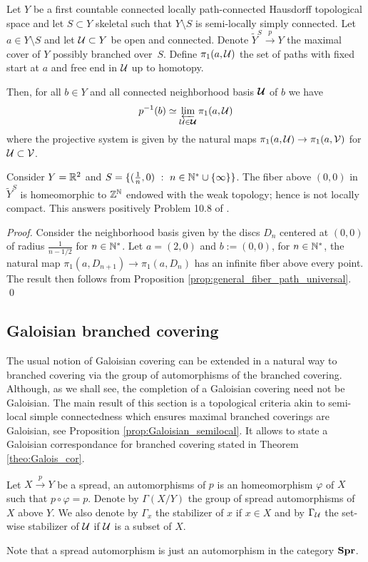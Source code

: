 \begin{prop} \label{prop:general_fiber_path_universal}
 Let $Y$ be a first countable connected locally path-connected Hausdorff topological space and let $S\subset Y$ skeletal such  that $Y\setminus S$ is semi-locally simply connected. Let $a\in Y\setminus S$ and let $\mathcal{U}\subset Y$ be open and connected.   Denote $\widetilde Y^S\xrightarrow{p} Y$ the maximal cover of $Y$ possibly branched over~$S$. Define
$\pi_1(a,\mathcal{U})$ the set of paths with fixed start at $a$ and free end in $\mathcal{U}$ up to homotopy.

Then, for all $b\in Y$ and all connected neighborhood basis $\boldsymbol {\mathcal{U}}$ of $b$ we have 
  $$ p^{-1}(b) \simeq \varprojlim_{\mathcal{U}\in \boldsymbol{\mathcal{U}}} \pi_1(a,\mathcal{U})$$
  where the projective system is given by the natural maps $\pi_1(a,\mathcal{U})\rightarrow \pi_1(a,\mathcal V)$  for $\mathcal{U}\subset \mathcal V$.
\end{prop}
  

\begin{ex} Consider $Y = \mathbb R^2$ and $S=\{(\frac{1}{n},0)~:~n\in \mathbb{N}^*\cup\{\infty\}\}$. The fiber above  $(0,0)$ in $\widetilde Y^S$ is homeomorphic to $\mathbb Z^{\mathbb{N}}$ endowed with the weak topology; hence is not locally compact. This answers positively Problem 10.8 of \cite{MR2198590}.
\end{ex}
\begin{proof}
 Consider the neighborhood basis given by the discs $D_n$ centered at $(0,0)$ of radius $\frac{1}{n-1/2}$ for $n\in \mathbb{N}^*$. Let $a = (2,0)$ and  $b:=(0,0)$, for $n\in \mathbb{N}^*$, the natural map $\pi_1(a,D_{n+1})\rightarrow\pi_1(a,D_{n})$ has an infinite fiber above every point. The result then follows from Proposition \ref{prop:general_fiber_path_universal}.
\qed\end{proof}



\subsection{Galoisian branched covering}\label{sec:galoisian_branched}

The usual notion of Galoisian covering can be extended in a natural way to branched covering via the group of automorphisms of the branched covering. Although, as we shall see, the completion of a Galoisian covering need not be Galoisian. The main result of this section is a topological criteria akin to semi-local simple connectedness which ensures maximal branched coverings are Galoisian, see Proposition \ref{prop:Galoisian_semilocal}. It allows to state a Galoisian correspondance for branched covering stated in Theorem \ref{theo:Galois_cor}.
\begin{defi} Let $X\xrightarrow{p} Y$ be a spread, an automorphisms of $p$ is an homeomorphism $\varphi$ of $X$ such that $p\circ \varphi = p$. 
Denote by  $\Gamma(X/Y)$ the group of spread automorphisms of $X$ above $Y$. 
We also denote by $\Gamma_x$ the stabilizer of $x$ if $x\in X$ and by $\Gamma_{\mathcal{U}}$ the set-wise stabilizer of $\mathcal{U}$ if $\mathcal{U}$  is a subset of $X$.
\end{defi}
Note that a spread automorphism is just an automorphism in the category $\mathbf{Spr}$.

